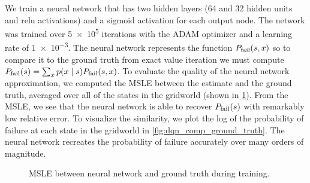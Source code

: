 We train a neural network that has two hidden layers (\num{64} and \num{32} hidden units and relu activations) and a sigmoid activation for each output node. The network was trained over \num{5e5} iterations with the ADAM optimizer and a learning rate of \num{1e-3}. The neural network represents the function $P_{\rm fail}(s,x)$ so to compare it to the ground truth from exact value iteration we must compute $P_{\rm fail}(s) = \sum_x p(x \mid s)P_{\rm fail}(s,x)$. To evaluate the quality of the neural network approximation, we computed the MSLE between the estimate and the ground truth, averaged over all of the states in the gridworld (shown in \cref{fig:gridworld_pfail_dqn_training_hist}). From the MSLE, we see that the neural network is able to recover $P_{\rm fail}(s)$ with remarkably low relative error. To visualize the similarity, we plot the log of the probability of failure at each state in the gridworld in \cref{fig:dqn_comp_ground_truth}. The neural network recreates the probability of failure accurately over many orders of magnitude. 

\begin{figure}
        \centering
        
        \caption{MSLE between neural network and ground truth during training.}
        \label{fig:gridworld_pfail_dqn_training_hist}
\end{figure}

